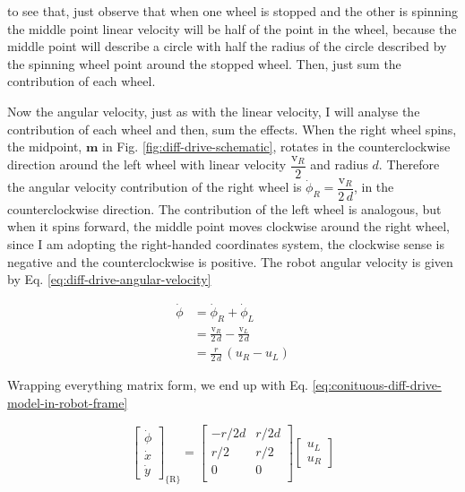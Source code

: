 \documentclass[12pt]{article}
\begin{document}
 to see that, just observe that when one wheel is stopped and the other is spinning the middle point linear velocity will be half of the point in the wheel, because the middle point will describe a circle with half the radius of the circle described by the spinning wheel point around the stopped wheel. Then, just sum the contribution of each wheel.

 Now the angular velocity, just as with the linear velocity, I will analyse the contribution of each wheel and then, sum the effects. When the right wheel spins, the midpoint, $\boldsymbol{m}$ in Fig. \ref{fig:diff-drive-schematic}, rotates in the counterclockwise direction around the left wheel with linear velocity $\dfrac{\mathrm{v}_R}{2}$ and radius $d$. Therefore the angular velocity contribution of the right wheel is $\dot{\phi}_R = \dfrac{\mathrm{v}_R}{2\,d}$, in the counterclockwise direction. The contribution of the left wheel is analogous, but when it spins forward, the middle point moves clockwise around the right wheel, since I am adopting the right-handed coordinates system, the clockwise sense is negative and the counterclockwise is positive. The robot angular velocity is given by Eq. \ref{eq:diff-drive-angular-velocity}

 \begin{equation}
 \begin{aligned}
     \dot{\phi} &= \dot{\phi}_R + \dot{\phi}_L\\
     &= \frac{\mathrm{v}_R}{2\,d} - \frac{\mathrm{v}_L}{2\,d}\\
     &= \frac{r}{2\,d} \, (u_R - u_L)
 \end{aligned}
 \label{eq:diff-drive-angular-velocity}
 \end{equation}

 Wrapping everything matrix form, we end up with Eq. \ref{eq:conituous-diff-drive-model-in-robot-frame}

 \begin{equation}
     \begin{bmatrix}
         \dot{\phi} \\ \dot{x} \\ \dot{y}
     \end{bmatrix}_{\{\mathrm{R}\}}= \begin{bmatrix}
         -r/2d & r/2d \\
         r/2 & r/2 \\
         0 & 0 \\
     \end{bmatrix} \begin{bmatrix} u_L \\ u_R \end{bmatrix}
     \label{eq:conituous-diff-drive-model-in-robot-frame}
 \end{equation}
\end{document}
